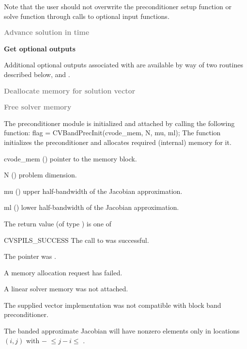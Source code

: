 \begin{Steps}
  Note that the user should not overwrite the preconditioner setup function
  or solve function through calls to  optional input functions.

\item
  \textcolor{gray}{\bf Advance solution in time}

\item
  {\bf Get optional outputs}

  Additional optional outputs associated with {\cvbandpre} are available by 
  way of two routines described below,
   and .

\item
  \textcolor{gray}{\bf Deallocate memory for solution vector}

\item
  \textcolor{gray}{\bf Free solver memory}
  
\end{Steps}
The {\cvbandpre} preconditioner module is initialized and attached
by calling the following function:
{
  flag = CVBandPrecInit(cvode\_mem, N, mu, ml);
}
{
  The function  initializes the {\cvbandpre} preconditioner
  and allocates required (internal) memory for it.
}
{
  \begin{args}
  \item[cvode\_mem] ()
    pointer to the {\cvodes} memory block.
  \item[N] ()
    problem dimension.
  \item[mu] ()
    upper half-bandwidth of the Jacobian approximation.
  \item[ml] ()
    lower half-bandwidth of the Jacobian approximation.
  \end{args}
}
{
  The return value  (of type ) is one of
  \begin{args}
  \item[CVSPILS\_SUCCESS]
    The call to  was successful.
  \item[\id{CVSPILS\_MEM\_NULL}] 
    The  pointer was .
  \item[\Id{CVSPILS\_MEM\_FAIL}]
    A memory allocation request has failed.
  \item[\Id{CVSPILS\_LMEM\_NULL}]
    A {\cvspils} linear solver memory was not attached.
  \item[\Id{CVSPILS\_ILL\_INPUT}]
    The supplied vector implementation was not compatible with block band preconditioner.
  \end{args}
}
{
  The banded approximate Jacobian will have nonzero elements only in locations
  $(i,j)$ with $-$ $\leq j-i \leq$ .
}

